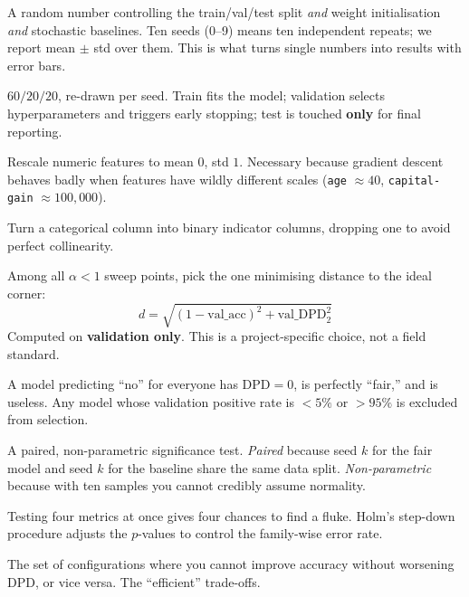 \documentclass[11pt,a4paper]{article}
\newcommand{\code}[1]{\texttt{\small #1}}
\begin{document}
\begin{description}[leftmargin=0em,style=nextline,itemsep=5pt]

\item[Seed]
A random number controlling the train/val/test split \emph{and} weight
initialisation \emph{and} stochastic baselines. Ten seeds (0--9) means ten
independent repeats; we report mean $\pm$ std over them. This is what turns
single numbers into results with error bars.

\item[Train / validation / test split]
$60/20/20$, re-drawn per seed. Train fits the model; validation selects
hyperparameters and triggers early stopping; test is touched \textbf{only} for
final reporting.

\item[StandardScaler]
Rescale numeric features to mean $0$, std $1$. Necessary because gradient
descent behaves badly when features have wildly different scales
(\code{age} $\approx 40$, \code{capital-gain} $\approx 100{,}000$).

\item[OneHotEncoder(drop='first')]
Turn a categorical column into binary indicator columns, dropping one to avoid
perfect collinearity.

\item[Utopia-point model selection]
Among all $\alpha<1$ sweep points, pick the one minimising distance to the ideal
corner:
\[ d = \sqrt{(1-\text{val\_acc})^2 + \text{val\_DPD}_2^2} \]
Computed on \textbf{validation only}. This is a project-specific choice, not a
field standard.

\item[Degenerate-predictor guard]
A model predicting ``no'' for everyone has $\mathrm{DPD}=0$, is perfectly
``fair,'' and is useless. Any model whose validation positive rate is $<5\%$ or
$>95\%$ is excluded from selection.

\item[Wilcoxon signed-rank test]
A paired, non-parametric significance test. \emph{Paired} because seed $k$ for
the fair model and seed $k$ for the baseline share the same data split.
\emph{Non-parametric} because with ten samples you cannot credibly assume
normality.

\item[Holm correction]
Testing four metrics at once gives four chances to find a fluke. Holm's
step-down procedure adjusts the $p$-values to control the family-wise error
rate.

\item[Pareto frontier]
The set of configurations where you cannot improve accuracy without worsening
DPD, or vice versa. The ``efficient'' trade-offs.

\end{description}
\end{document}
